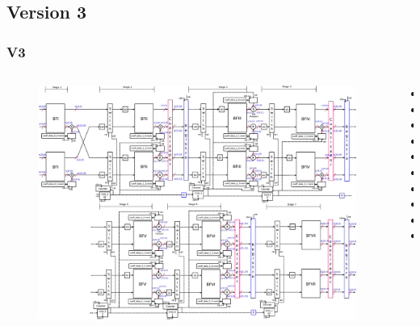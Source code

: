 \documentclass[t]{beamer}
\begin{document}
\subsection{Version 3}
\begin{frame}
\frametitle{V3}	
\begin{columns}[T] %
\begin{column}{.7\textwidth}
\vspace*{-0.8cm}

 \begin{figure}[ht]
    \centering
  \includegraphics[height=0.66\paperheight]{image/V3_esquema_p.eps} \\
    \end{figure}

\end{column}%

\begin{column}{.3\textwidth}


\begin{itemize}
\item
\item
\item
\item
\item
\item
\item
\item
\item
\item
\end{itemize}

\end{column}
\end{columns}

\end{frame}
\end{document}
